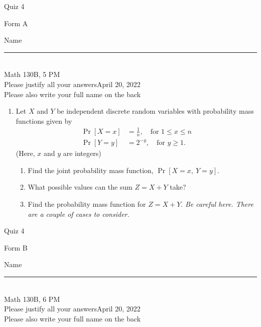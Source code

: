 \documentclass[12pt]{article}
\begin{document}
\begin{flushleft} 
\centerline{\LARGE{Quiz 4}} 
\vspace{5 mm}
{Form A}\hfill  
{Name \rule {2 in}{0.01in}}\\
Math 130B, 5 PM
\\
{Please justify all your answers}\hfill {April 20, 2022}
\\
{Please also write your full name on the back} 

\medskip
\end{flushleft}

\begin{enumerate}

	\item Let $X$ and $Y$ be independent discrete random variables with probability mass functions given by
	\begin{align*}
		\Pr[X = x] &= \frac{1}{n},\quad \text{for }1\leq x\leq n\\
		\Pr[Y = y] &= 2^{-y},\quad\text{for }y \geq 1.
	\end{align*}
	(Here, $x$ and $y$ are integers)
	\begin{enumerate}
		\item Find the joint probability mass function, $\Pr[X = x,\ Y = y]$.
		\vfill

		\item What possible values can the sum $Z = X+Y$ take?

		\vfill

		\item Find the probability mass function for $Z = X+Y$. \textit{Be careful here. There are a couple of cases to consider.}
	\end{enumerate}

	\vfill\null
\end{enumerate}
\pagebreak


\begin{flushleft} 
\centerline{\LARGE{Quiz 4}} 
\vspace{5 mm}
{Form B}\hfill  
{Name \rule {2 in}{0.01in}}\\
Math 130B, 6 PM
\\
{Please justify all your answers}\hfill {April 20, 2022}
\\
{Please also write your full name on the back} 

\medskip
\end{flushleft}
\end{document}
